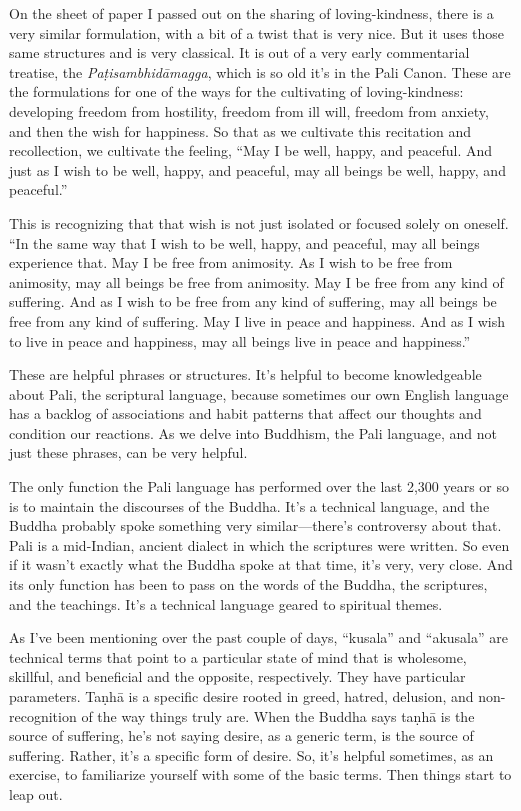 On the sheet of paper I passed out on the sharing of loving-kindness,
there is a very similar formulation, with a bit of a twist that is very
nice. But it uses those same structures and is very classical. It is out
of a very early commentarial treatise, the \emph{Paṭisambhidāmagga},
which is so old it’s in the Pali Canon. These are the formulations for
one of the ways for the cultivating of loving-kindness: developing
freedom from hostility, freedom from ill will, freedom from anxiety, and
then the wish for happiness. So that as we cultivate this recitation and
recollection, we cultivate the feeling, “May I be well, happy, and
peaceful. And just as I wish to be well, happy, and peaceful, may all
beings be well, happy, and peaceful.”

This is recognizing that that wish is not just isolated or focused
solely on oneself. “In the same way that I wish to be well, happy, and
peaceful, may all beings experience that. May I be free from animosity.
As I wish to be free from animosity, may all beings be free from
animosity. May I be free from any kind of suffering. And as I wish to be
free from any kind of suffering, may all beings be free from any kind of
suffering. May I live in peace and happiness. And as I wish to live in
peace and happiness, may all beings live in peace and happiness.”

These are helpful phrases or structures. It’s helpful to become
knowledgeable about Pali, the scriptural language, because sometimes our
own English language has a backlog of associations and habit patterns
that affect our thoughts and condition our reactions. As we delve into
Buddhism, the Pali language, and not just these phrases, can be very
helpful.

The only function the Pali language has performed over the last 2,300
years or so is to maintain the discourses of the Buddha. It’s a
technical language, and the Buddha probably spoke something very
similar—there’s controversy about that. Pali is a mid-Indian, ancient
dialect in which the scriptures were written. So even if it wasn’t
exactly what the Buddha spoke at that time, it’s very, very close. And
its only function has been to pass on the words of the Buddha, the
scriptures, and the teachings. It’s a technical language geared to
spiritual themes.

As I’ve been mentioning over the past couple of days, “kusala” and
“akusala” are technical terms that point to a particular state of mind
that is wholesome, skillful, and beneficial and the opposite,
respectively. They have particular parameters. Taṇhā is a specific
desire rooted in greed, hatred, delusion, and non-recognition of the way
things truly are. When the Buddha says taṇhā is the source of suffering,
he’s not saying desire, as a generic term, is the source of suffering.
Rather, it’s a specific form of desire. So, it’s helpful sometimes, as
an exercise, to familiarize yourself with some of the basic terms. Then
things start to leap out.

